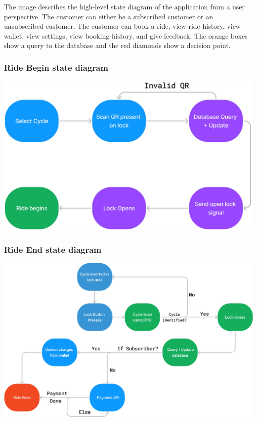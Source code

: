 \documentclass[11pt]{article}
\begin{document}
The image describes the high-level state diagram of the application from a user perspective. The customer can either be a subscribed customer or an unsubscribed customer. The customer can book a ride, view ride history, view wallet, view settings, view booking history, and give feedback. The orange boxes show a query to the database and the red diamonds show a decision point.

\subsubsection{Ride Begin state diagram}
\begin{center}
  \includegraphics[scale=0.25]{state-diagram-images/ride_begin.jpg}
\end{center}

\subsubsection{Ride End state diagram}
\begin{center}
  \includegraphics[scale=0.2]{state-diagram-images/ride_end.jpg}
\end{center}
\end{document}

